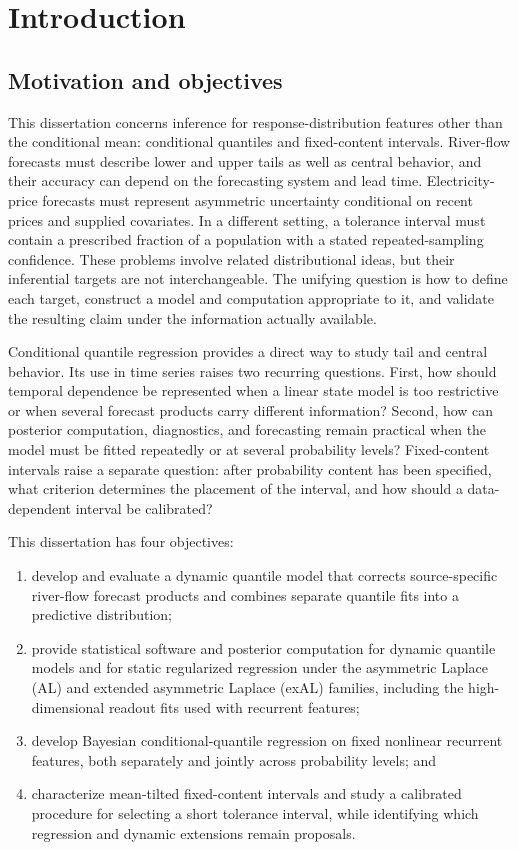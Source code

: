 \chapter{Introduction}
\label{ch:introduction}

\section{Motivation and objectives}
\label{sec:intro-problem}

This dissertation concerns inference for response-distribution features other
than the conditional mean: conditional quantiles and fixed-content intervals.
River-flow forecasts must describe lower and upper
tails as well as central behavior, and their accuracy can depend on the
forecasting system and lead time. Electricity-price forecasts must represent
asymmetric uncertainty conditional on recent prices and supplied covariates.
In a different setting, a tolerance interval must contain a prescribed fraction
of a population with a stated repeated-sampling confidence. These problems
involve related distributional ideas, but their inferential targets are not
interchangeable. The unifying question is how to define each target, construct
a model and computation appropriate to it, and validate the resulting claim
under the information actually available.

Conditional quantile regression provides a direct way to study tail and central
behavior. Its use in time series raises two recurring questions. First, how
should temporal dependence be represented when a linear state model is too
restrictive or when several forecast products carry different information?
Second, how can posterior computation, diagnostics, and forecasting remain
practical when the model must be fitted repeatedly or at several probability
levels? Fixed-content intervals raise a separate question: after probability
content has been specified, what criterion determines the placement of the
interval, and how should a data-dependent interval be calibrated?

This dissertation has four objectives:

\begin{enumerate}
\item develop and evaluate a dynamic quantile model that corrects
source-specific river-flow forecast products and combines separate quantile
fits into a predictive distribution;
\item provide statistical software and posterior computation for dynamic
quantile models and for static regularized regression under the
asymmetric Laplace (AL) and extended asymmetric Laplace (exAL) families,
including the high-dimensional readout fits used with recurrent features;
\item develop Bayesian conditional-quantile regression on fixed nonlinear
recurrent features, both separately and jointly across probability levels; and
\item characterize mean-tilted fixed-content intervals and study a calibrated
procedure for selecting a short tolerance interval, while identifying which
regression and dynamic extensions remain proposals.
\end{enumerate}

